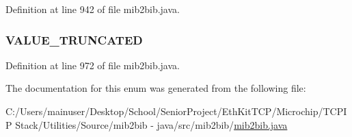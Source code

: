 Definition at line 942 of file mib2bib.\+java.

\hypertarget{enummib2bib_1_1mib2bib_1_1_f_i_l_e___e_r_r_o_r___c_o_d_e_aa5f01ad787de75486af134e1eb2328cd}{}
\subsubsection[{V\+A\+L\+U\+E\+\_\+\+T\+R\+U\+N\+C\+A\+T\+E\+D}]{\setlength{\rightskip}{0pt plus 5cm}V\+A\+L\+U\+E\+\_\+\+T\+R\+U\+N\+C\+A\+T\+E\+D}\label{enummib2bib_1_1mib2bib_1_1_f_i_l_e___e_r_r_o_r___c_o_d_e_aa5f01ad787de75486af134e1eb2328cd}


Definition at line 972 of file mib2bib.\+java.



The documentation for this enum was generated from the following file\+:\begin{DoxyCompactItemize}
\item 
C\+:/\+Users/mainuser/\+Desktop/\+School/\+Senior\+Project/\+Eth\+Kit\+T\+C\+P/\+Microchip/\+T\+C\+P\+I\+P Stack/\+Utilities/\+Source/mib2bib -\/ java/src/mib2bib/\hyperlink{mib2bib_8java}{mib2bib.\+java}\end{DoxyCompactItemize}
